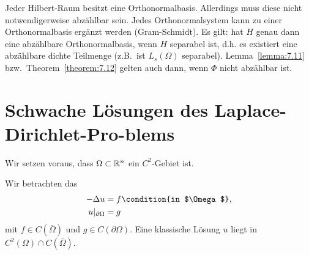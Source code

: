 \begin{bem}
  \label{bem:7.13}
  Jeder Hilbert-Raum besitzt eine Orthonormalbasis. Allerdings muss diese nicht notwendigerweise abzählbar sein. Jedes Orthonormalsystem kann zu einer Orthonormalbasis ergänzt werden (Gram-Schmidt). Es gilt: hat $H$ genau dann eine abzählbare Orthonormalbasis, wenn $H$ separabel ist, d.h. es existiert eine abzählbare dichte Teilmenge (z.B.\ ist $L_s(\Omega)$ separabel). Lemma~\ref{lemma:7.11} bzw.\ Theorem~\ref{theorem:7.12} gelten auch dann, wenn $\Phi$ nicht abzählbar ist.
\end{bem}

\section{Schwache Lösungen des Laplace-Dirichlet-Pro-blems}

Wir setzen voraus, dass $\Omega\subset\mathbb{R}^n$ ein $C^2$-Gebiet ist.

Wir betrachten das 
\begin{align*}
  -\Delta u& =f\condition{in $\Omega$}, \\ u\rvert_{\partial\Omega}&=g
\end{align*}
mit $f\in C(\bar\Omega)$ und $g\in C(\partial\Omega)$. Eine klassische Lösung $u$ liegt in $C^2(\Omega)\cap C(\bar\Omega)$.


